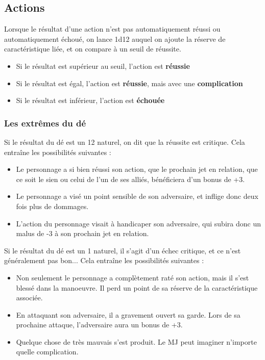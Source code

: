 \documentclass[twoside,12pt,english]{book}
\begin{document}
\subsection{Actions}

Lorsque le résultat d'une action n'est pas automatiquement réussi ou automatiquement échoué, on lance 1d12 auquel on ajoute la réserve de caractéristique liée, et on compare à un seuil de réussite. 

\begin{itemize}
	\item Si le résultat est supérieur au seuil, l'action est \textbf{réussie}
	\item Si le résultat est égal, l'action est \textbf{réussie}, mais avec une \textbf{complication}
	\item Si le résultat est inférieur, l'action est \textbf{échouée}
\end{itemize}

\subsubsection*{Les extrêmes du dé}

Si le résultat du dé est un 12 naturel, on dit que la réussite est critique. Cela entraîne les possibilités suivantes :

\begin{itemize}
	\item Le personnage a si bien réussi son action, que le prochain jet en relation, que ce soit le sien ou celui de l'un de ses alliés, bénéficiera d'un bonus de +3.
	\item Le personnage a visé un point sensible de son adversaire, et inflige donc deux fois plus de dommages.
	\item L'action du personnage visait à handicaper son adversaire, qui subira donc un malus de -3 à son prochain jet en relation.
\end{itemize}

Si le résultat du dé est un 1 naturel, il s'agit d'un échec critique, et ce n'est généralement pas bon... Cela entraîne les possibilités suivantes :

\begin{itemize}
	\item Non seulement le personnage a complètement raté son action, mais il s'est blessé dans la manoeuvre. Il perd un point de sa réserve de la caractéristique associée.
	\item En attaquant son adversaire, il a gravement ouvert sa garde. Lors de sa prochaine attaque, l'adversaire aura un bonus de +3.
	\item Quelque chose de très mauvais s'est produit. Le MJ peut imaginer n'importe quelle complication.
\end{itemize}
\end{document}
